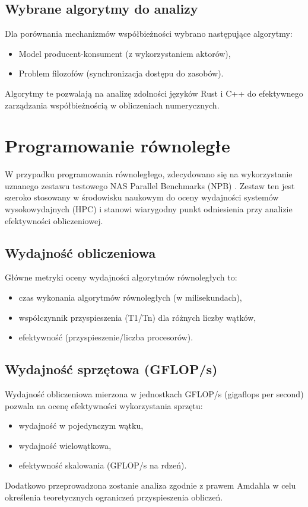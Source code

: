 \subsection{Wybrane algorytmy do analizy}
Dla porównania mechanizmów współbieżności wybrano następujące algorytmy:
\begin{itemize}
    \item Model producent-konsument (z wykorzystaniem aktorów),
    \item Problem filozofów (synchronizacja dostępu do zasobów).
\end{itemize}
Algorytmy te pozwalają na analizę zdolności języków Rust i C++ do efektywnego zarządzania współbieżnością w obliczeniach numerycznych.


\section{Programowanie równoległe}
W przypadku programowania równoległego, zdecydowano się na wykorzystanie uznanego zestawu testowego NAS Parallel Benchmarks (NPB) \cite{nasaParallelBenchmarks}. Zestaw ten jest szeroko stosowany w środowisku naukowym do oceny wydajności systemów wysokowydajnych (HPC) i stanowi wiarygodny punkt odniesienia przy analizie efektywności obliczeniowej.
\subsection{Wydajność obliczeniowa}
Główne metryki oceny wydajności algorytmów równoległych to:
\begin{itemize}
\item czas wykonania algorytmów równoległych (w milisekundach),
\item współczynnik przyspieszenia (T1/Tn) dla różnych liczby wątków,
\item efektywność (przyspieszenie/liczba procesorów).
\end{itemize}

\subsection{Wydajność sprzętowa (GFLOP/s)}
Wydajność obliczeniowa mierzona w jednostkach GFLOP/s (gigaflops per second) pozwala na ocenę efektywności wykorzystania sprzętu:
\begin{itemize}
\item wydajność w pojedynczym wątku,
\item wydajność wielowątkowa,
\item efektywność skalowania (GFLOP/s na rdzeń).
\end{itemize}
Dodatkowo przeprowadzona zostanie analiza zgodnie z prawem Amdahla w celu określenia teoretycznych ograniczeń przyspieszenia obliczeń.

